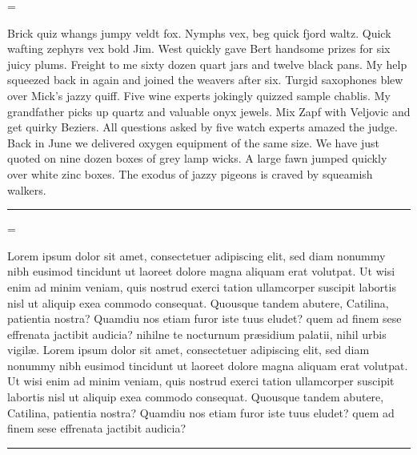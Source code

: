 \pantext={Brick quiz whangs jumpy veldt fox.
Nymphs vex, beg quick fjord waltz.
Quick wafting zephyrs vex bold Jim.
West quickly gave Bert handsome prizes for six juicy plums.
Freight to me sixty dozen quart jars and twelve black pans.
My help squeezed back in again and joined the weavers after six.
Turgid saxophones blew over Mick's jazzy quiff.
Five wine experts jokingly quizzed sample chablis.
My grandfather picks up quartz and valuable onyx jewels.
Mix Zapf with Veljovic and get quirky Beziers.
All questions asked by five watch experts amazed the judge.
Back in June we delivered oxygen equipment of the same size.
We have just quoted on nine dozen boxes of grey lamp wicks.
A large fawn jumped quickly over white zinc boxes.
The exodus of jazzy pigeons is craved by squeamish walkers.\thinspace\nobreak\leaders\hrule\hfill\hbox{}\par}

\loremtext={Lorem ipsum
dolor sit amet, consectetuer adipiscing elit, sed diam
nonummy nibh eusi\-mod tincidunt ut laor\-eet dolore magna
ali\-quam erat volutpat. Ut wisi enim ad minim veniam, quis
nostrud exerci tation ullamcorper suscipit la\-bortis nisl
ut ali\-quip exea commodo consequat.
Quousque tandem abutere, Catilina, patientia nostra? Quamdiu nos etiam furor iste tuus eludet?
quem ad finem sese effrenata jactibit audicia? nihilne te nocturnum pr\ae sidium palatii, nihil
urbis vigil\ae .
Lorem ipsum
dolor sit amet, consectetuer adipiscing elit, sed diam
nonummy nibh eusi\-mod tincidunt ut laor\-eet dolore magna
ali\-quam erat volutpat. Ut wisi enim ad minim veniam, quis
nostrud exerci tation ullamcorper suscipit la\-bortis nisl
ut ali\-quip exea commodo consequat.
Quousque tandem abutere, Catilina, patientia nostra? Quamdiu nos etiam furor iste tuus eludet?
quem ad finem sese effrenata jactibit audicia?
\thinspace\nobreak\leaders\hrule\hfill\null\par}

\def\abc{abcdefghijklmnopqrstuvwxyz}
\def\habc{\abc\abc abcdefghijklm}
\def\dabc{AGQMstaefgpy1234?!\&}
\def\ucabc{ABCDEFGHIJKLMNOPQRSTUVWXYZ}
\def\freqabc{\text  zjqx%
       kkvv%
       bbbbppppyyyywwwwgggg%
       mmmmmmffffffccccccuuuuuu%
       lllllllldddddddd%
       hhhhhhhhhhhhrrrrrrrrrrrrssssssssssss%
       ooooooooooooooiiiiiiiiiiiiiinnnnnnnnnnnnnn%
       aaaaaaaaaaaaaaaatttttttttttttttttt%
       eeeeeeeeeeeeeeeeeeeeeeee}%

